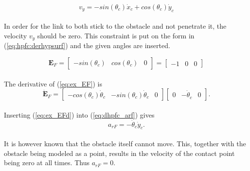 \begin{equation}
    v_y = - sin(\theta_c) \dot{x}_c + cos(\theta_c) \dot{y}_c
\end{equation}
\\
In order for the link to both stick to the obstacle and not penetrate it, the velocity $v_y$ should be zero. This constraint is put on the form in (\ref{eq:hpfc:derhypsurf}) and the given angles are inserted.

\begin{equation}\label{eq:ex_EF}
    \mathbf{E}_F = 
    \begin{bmatrix}
        - sin(\theta_c) & cos(\theta_c) & 0
    \end{bmatrix}
    =
    \begin{bmatrix}
        - 1 & 0 & 0
    \end{bmatrix}
\end{equation}
\\
The derivative of (\ref{eq:ex_EF}) is
\begin{equation}\label{eq:ex_EFd}
    \mathbf{\dot{E}}_F = 
    \begin{bmatrix}
        -cos(\theta_c) \dot{\theta}_c & - sin(\theta_c) \dot{\theta}_c & 0
    \end{bmatrix}
    \begin{bmatrix}
        0 & -\dot{\theta}_c & 0
    \end{bmatrix}.
\end{equation}
\\
Inserting (\ref{eq:ex_EFd}) into (\ref{eq:dhpfc_arf}) gives
\begin{equation}
    a_{rF} = -\dot{\theta}_c \dot{y}_c.
\end{equation}
\\
It is however known that the obstacle itself cannot move. This, together with the obstacle being modeled as a point, results in the velocity of the contact point being zero at all times. Thus $a_{rF}=0$.

